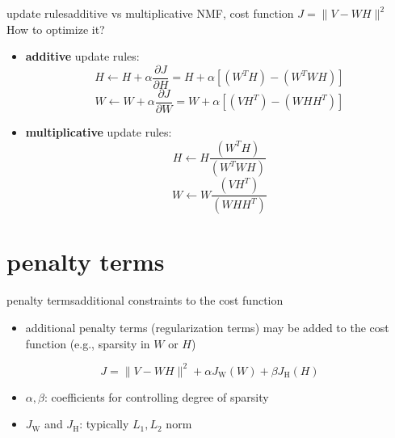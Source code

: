         \begin{frame}{update rules}{additive vs multiplicative} 
           NMF, cost function $J = \parallel V - WH\parallel^{2}$\\ How to optimize it? 
           \begin{itemize}
                \item  \textbf{additive} update rules:
                \begin{equation*}
                H \leftarrow H + \alpha \frac{\partial J}{\partial H} = H + \alpha [(W^{T}H) - (W^{T}WH)]
                \end{equation*}
                \begin{equation*}
                W \leftarrow W + \alpha \frac{\partial J}{\partial W} = W + \alpha [(VH^{T}) - (WHH^{T})]
                \end{equation*}
			   \item  \textbf{multiplicative} update rules:
                \begin{equation*}
                H \leftarrow H \frac{(W^{T}H)}{(W^{T}WH)}
                \end{equation*}
                \begin{equation*}
                W \leftarrow W \frac{(VH^{T})}{(WHH^{T})}
                \end{equation*}
           \end{itemize}
        \end{frame}        
    
    \section[penalty terms]{penalty terms}
        \begin{frame}{penalty terms}{additional constraints to the cost function}
            \begin{itemize}
                \item   additional penalty terms (regularization terms) may be added to the cost function (e.g., sparsity in $W$ or $H$)
            \end{itemize}
            \begin{equation*}
                J = \parallel V - WH\parallel^{2} + \alpha J_\mathrm{W}(W) + \beta J_\mathrm{H}(H)
            \end{equation*}
            \begin{itemize}
                \item $\alpha,\beta$: coefficients for controlling degree of sparsity
                \item $J_\mathrm{W}$ and $J_\mathrm{H}$: typically $L_{1},L_{2}$ norm 
            \end{itemize}
        \end{frame}
              
